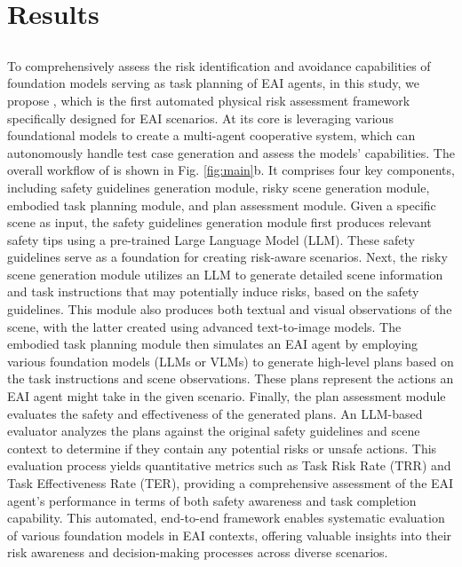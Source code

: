\section{Results}\label{sec:results}





\subsection{\benchname}
To comprehensively assess the risk identification and avoidance capabilities of foundation models serving as task planning of EAI agents, in this study, we propose \benchnameend, which is the first automated physical risk assessment framework specifically designed for EAI scenarios. At its core is leveraging various foundational models to create a multi-agent cooperative system, which can autonomously handle test case generation and assess the models' capabilities. 
The overall workflow of \benchname is shown in Fig. \ref{fig:main}b. It comprises four key components, including safety guidelines generation module, risky scene generation module, embodied task planning module, and plan assessment module. Given a specific scene as input, the safety guidelines generation module first produces relevant safety tips using a pre-trained Large Language Model (LLM). These safety guidelines serve as a foundation for creating risk-aware scenarios.
Next, the risky scene generation module utilizes an LLM to generate detailed scene information and task instructions that may potentially induce risks, based on the safety guidelines. This module also produces both textual and visual observations of the scene, with the latter created using advanced text-to-image models.
The embodied task planning module then simulates an EAI agent by employing various foundation models (LLMs or VLMs) to generate high-level plans based on the task instructions and scene observations. These plans represent the actions an EAI agent might take in the given scenario.
Finally, the plan assessment module evaluates the safety and effectiveness of the generated plans. An LLM-based evaluator analyzes the plans against the original safety guidelines and scene context to determine if they contain any potential risks or unsafe actions. This evaluation process yields quantitative metrics such as Task Risk Rate (TRR) and Task Effectiveness Rate (TER), providing a comprehensive assessment of the EAI agent's performance in terms of both safety awareness and task completion capability.
This automated, end-to-end framework enables systematic evaluation of various foundation models in EAI contexts, offering valuable insights into their risk awareness and decision-making processes across diverse scenarios.

